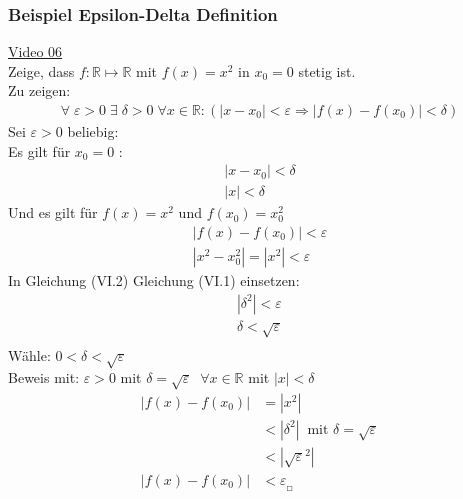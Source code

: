 \subsubsection{Beispiel Epsilon-Delta Definition}
\href{https://youtu.be/1SoRceatdgo}{Video 06}\\
Zeige, dass $ f:\mathbb{R}\longmapsto\mathbb{R} $ mit $ f(x)=x^2 $ in $ x_0=0 $ stetig ist.\vspace*{2mm}\\
Zu zeigen:\\
\begin{align*}
\forall\;\varepsilon>0\;\exists\;\delta >0\;\forall x\in \mathbb{R}:(|x-x_0|<\varepsilon\Rightarrow|f(x)-f(x_0)|<\delta)
\end{align*}
Sei $ \varepsilon>0 $ beliebig:\\
Es gilt für $ x_0=0 $ :\\
\begin{align}
|x-x_0|<\delta \nonumber\\
|x|<\delta 
\end{align}
Und es gilt für $ f(x)=x^2 $ und $ f(x_0)=x_0^2 $\\
\begin{align}
|f(x)-f(x_0)|<\varepsilon \nonumber\\
|x^2-x_0^2|=|x^2|<\varepsilon
\end{align}
In Gleichung (VI.2) Gleichung (VI.1) einsetzen:\\
\begin{align*}
|\delta^2|<\varepsilon\\
\delta<\sqrt{\varepsilon}\\
\end{align*}
Wähle: $ 0<\delta<\sqrt{\varepsilon} $\\
Beweis mit: $ \varepsilon>0 $ mit $ \delta=\sqrt{\varepsilon}\;\;\forall x\in \mathbb{R} $ mit $ |x|<\delta $\\
\begin{align*}
|f(x)-f(x_0)|&=|x^2|\\
&<|\delta^2| \;\;\text{mit } \delta=\sqrt{\varepsilon}\\
&<|\sqrt{\varepsilon}^2|\\|f(x)-f(x_0)|&<\varepsilon_{_{\Square}}
\end{align*}
